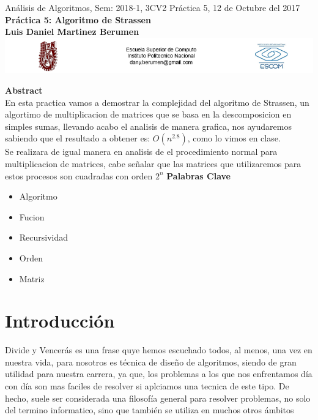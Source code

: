 \documentclass[spanish]{article}
\begin{document}
	\setmarginsrb{30mm}{30mm}{30mm}{30mm}{0pt}{0mm}{0pt}{0mm}
	\begin{center}
	{\Large Análisis de Algoritmos, Sem: 2018-1, 3CV2 Práctica 5, 12 de Octubre del 2017}\\
	{\huge {\bf Práctica 5: Algoritmo de Strassen}} \\
	{\large {\bf Luis Daniel Martinez Berumen}}\\
	\includegraphics[width=1\textwidth]{./imagenes/logos.png}\\
\end{center}
	
	\bigskip
	
	\bigskip
	
	\bigskip
	
	{\LARGE {\bf Abstract}}\\
En esta practica vamos a demostrar la complejidad del algoritmo de Strassen, un algortimo de multiplicacion de matrices que se basa en la descomposicion en simples sumas, llevando acabo el analisis de manera grafica, nos ayudaremos sabiendo que el resultado a obtener es: $O(n^{2.8})$, como lo vimos en clase.\\
Se realizara de igual manera en analisis de el procedimiento normal para multiplicacion de matrices, cabe señalar que las matrices que utilizaremos para estos procesos son cuadradas con orden $2^{n}$
\bigskip
	{\Large {\bf Palabras Clave}}\\
	\begin{itemize}
		\item Algoritmo
		\item Fucion
		\item Recursividad
		\item Orden
		\item Matriz
	\end{itemize}
	
	\section{Introducci\'on}
	Divide y Vencerás es una frase quye hemos escuchado todos, al menos, una vez en nuestra vida, para nosotros 
	es técnica de diseño de algoritmos, siendo de gran utilidad para nuestra carrera, ya que, 
	los problemas a los que nos enfrentamos día con día son mas faciles de resolver si aplciamos una tecnica de este tipo.
	De hecho, suele ser considerada una filosofía general para resolver problemas, no solo del termino informatico, sino que también           se utiliza en muchos otros ámbitos
\end{document}
